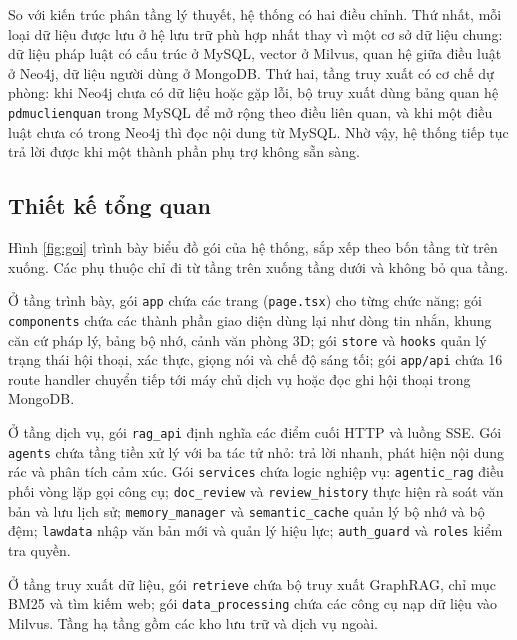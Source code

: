 \documentclass[../DoAn.tex]{subfiles}
\begin{document}
So với kiến trúc phân tầng lý thuyết, hệ thống có hai điều chỉnh. Thứ nhất, mỗi loại dữ liệu được lưu ở hệ lưu trữ phù hợp nhất thay vì một cơ sở dữ liệu chung: dữ liệu pháp luật có cấu trúc ở MySQL, vector ở Milvus, quan hệ giữa điều luật ở Neo4j, dữ liệu người dùng ở MongoDB. Thứ hai, tầng truy xuất có cơ chế dự phòng: khi Neo4j chưa có dữ liệu hoặc gặp lỗi, bộ truy xuất dùng bảng quan hệ \texttt{pdmuclienquan} trong MySQL để mở rộng theo điều liên quan, và khi một điều luật chưa có trong Neo4j thì đọc nội dung từ MySQL. Nhờ vậy, hệ thống tiếp tục trả lời được khi một thành phần phụ trợ không sẵn sàng.

\subsection{Thiết kế tổng quan}
Hình \ref{fig:goi} trình bày biểu đồ gói của hệ thống, sắp xếp theo bốn tầng từ trên xuống. Các phụ thuộc chỉ đi từ tầng trên xuống tầng dưới và không bỏ qua tầng.


Ở tầng trình bày, gói \texttt{app} chứa các trang (\texttt{page.tsx}) cho từng chức năng; gói \texttt{components} chứa các thành phần giao diện dùng lại như dòng tin nhắn, khung căn cứ pháp lý, bảng bộ nhớ, cảnh văn phòng 3D; gói \texttt{store} và \texttt{hooks} quản lý trạng thái hội thoại, xác thực, giọng nói và chế độ sáng tối; gói \texttt{app/api} chứa 16 route handler chuyển tiếp tới máy chủ dịch vụ hoặc đọc ghi hội thoại trong MongoDB.

Ở tầng dịch vụ, gói \texttt{rag\_api} định nghĩa các điểm cuối HTTP và luồng SSE. Gói \texttt{agents} chứa tầng tiền xử lý với ba tác tử nhỏ: trả lời nhanh, phát hiện nội dung rác và phân tích cảm xúc. Gói \texttt{services} chứa logic nghiệp vụ: \texttt{agentic\_rag} điều phối vòng lặp gọi công cụ; \texttt{doc\_review} và \texttt{review\_history} thực hiện rà soát văn bản và lưu lịch sử; \texttt{memory\_manager} và \texttt{semantic\_cache} quản lý bộ nhớ và bộ đệm; \texttt{lawdata} nhập văn bản mới và quản lý hiệu lực; \texttt{auth\_guard} và \texttt{roles} kiểm tra quyền.

Ở tầng truy xuất dữ liệu, gói \texttt{retrieve} chứa bộ truy xuất GraphRAG, chỉ mục BM25 và tìm kiếm web; gói \texttt{data\_processing} chứa các công cụ nạp dữ liệu vào Milvus. Tầng hạ tầng gồm các kho lưu trữ và dịch vụ ngoài.
\end{document}
